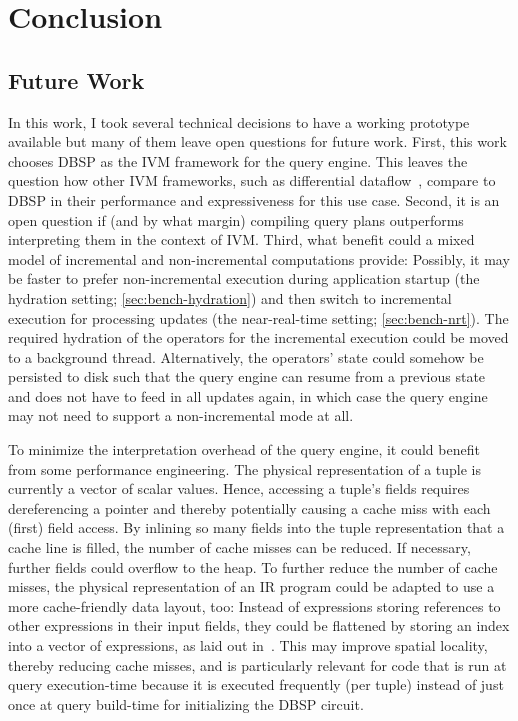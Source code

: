 
\chapter{Conclusion}\label{ch:conclusion}

\section{Future Work}\label{sec:future-work}

In this work, I took several technical decisions to have a working prototype
available but many of them leave open questions for future work.
First, this work chooses DBSP as the \ac{IVM} framework for the query engine.
This leaves the question how other \ac{IVM} frameworks, such as differential
dataflow~\cite{mcsherry2013differential}, compare to DBSP in their performance
and expressiveness for this use case.
Second, it is an open question if (and by what margin) compiling query plans
outperforms interpreting them in the context of \ac{IVM}.
Third, what benefit could a mixed model of incremental and non-incremental
computations provide:
Possibly, it may be faster to prefer non-incremental execution during application
startup (the hydration setting; \ref{sec:bench-hydration}) and then switch to
incremental execution for processing updates
(the near-real-time setting; \ref{sec:bench-nrt}).
The required hydration of the operators for the incremental execution could be
moved to a background thread.
Alternatively, the operators' state could somehow be persisted to disk such that
the query engine can resume from a previous state and does not have to
feed in all updates again, in which case the query engine may not need
to support a non-incremental mode at all.

To minimize the interpretation overhead of the query engine, it could
benefit from some performance engineering.
The physical representation of a tuple is currently a vector of scalar values.
Hence, accessing a tuple's fields requires dereferencing a pointer and thereby
potentially causing a cache miss with each (first) field access.
By inlining so many fields into the tuple representation that a cache line
is filled, the number of cache misses can be reduced.
If necessary, further fields could overflow to the heap\footnotemark{}.
To further reduce the number of cache misses, the physical representation of an
\ac{IR} program could be adapted to use a more cache-friendly data layout, too:
Instead of expressions storing references to other expressions in their
input fields, they could be flattened by storing an index into a vector of
expressions, as laid out in~\cite{sampson2023flattening}.
This may improve spatial locality, thereby reducing cache misses, and is
particularly relevant for code that is run at query execution-time because
it is executed frequently (per tuple) instead of just once at query build-time
for initializing the DBSP circuit.

